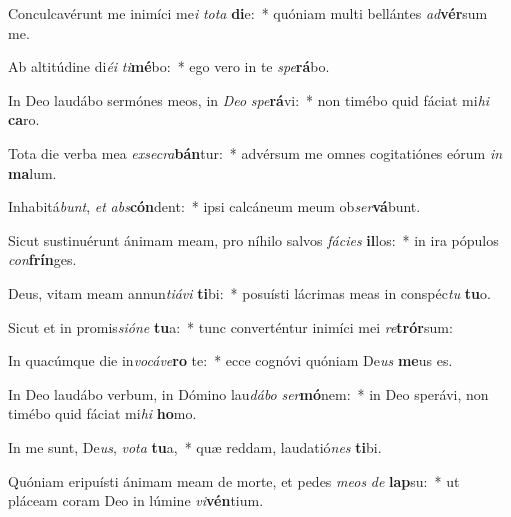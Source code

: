 \item Conculcavérunt me inimíci me\textit{i} \textit{to}\textit{ta} \textbf{di}e:~* quóniam multi bellántes \textit{ad}\textbf{vér}sum me.
\item Ab altitúdine di\textit{é}\textit{i} \textit{ti}\textbf{mé}bo:~* ego vero in te \textit{spe}\textbf{rá}bo.
\item In Deo laudábo sermónes meos, in \textit{De}\textit{o} \textit{spe}\textbf{rá}vi:~* non timébo quid fáciat mi\textit{hi} \textbf{ca}ro.
\item Tota die verba mea \textit{ex}\textit{se}\textit{cra}\textbf{bán}tur:~* advérsum me omnes cogitatiónes eórum \textit{in} \textbf{ma}lum.
\item Inhabitá\textit{bunt}, \textit{et} \textit{abs}\textbf{cón}dent:~* ipsi calcáneum meum ob\textit{ser}\textbf{vá}bunt.
\item Sicut sustinuérunt ánimam meam, pro níhilo salvos \textit{fá}\textit{ci}\textit{es} \textbf{il}los:~* in ira pópulos \textit{con}\textbf{frín}ges.
\item Deus, vitam meam annun\textit{ti}\textit{á}\textit{vi} \textbf{ti}bi:~* posuísti lácrimas meas in conspéc\textit{tu} \textbf{tu}o.
\item Sicut et in promis\textit{si}\textit{ó}\textit{ne} \textbf{tu}a:~* tunc converténtur inimíci mei \textit{re}\textbf{trór}sum:
\item In quacúmque die in\textit{vo}\textit{cá}\textit{ve}\textbf{ro} te:~* ecce cognóvi quóniam De\textit{us} \textbf{me}us es.
\item In Deo laudábo verbum, in Dómino lau\textit{dá}\textit{bo} \textit{ser}\textbf{mó}nem:~* in Deo sperávi, non timébo quid fáciat mi\textit{hi} \textbf{ho}mo.
\item In me sunt, De\textit{us}, \textit{vo}\textit{ta} \textbf{tu}a,~* quæ reddam, laudatió\textit{nes} \textbf{ti}bi.
\item Quóniam eripuísti ánimam meam de morte, et pedes \textit{me}\textit{os} \textit{de} \textbf{lap}su:~* ut pláceam coram Deo in lúmine \textit{vi}\textbf{vén}tium.
